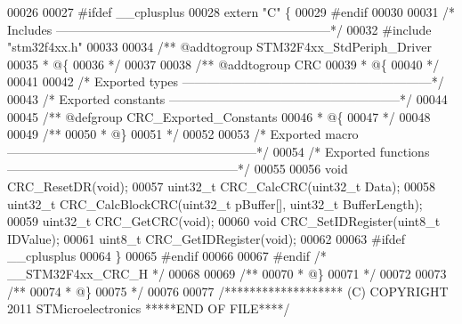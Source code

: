 \begin{DoxyCode}
00026 
00027 \textcolor{preprocessor}{#}\textcolor{preprocessor}{ifdef} \_\_cplusplus
00028  \textcolor{keyword}{extern} \textcolor{stringliteral}{"C"} \{
00029 \textcolor{preprocessor}{#}\textcolor{preprocessor}{endif}
00030 
00031 \textcolor{comment}{/* Includes ------------------------------------------------------------------*/}
00032 \textcolor{preprocessor}{#}\textcolor{preprocessor}{include} "stm32f4xx.h"
00033 
00034 \textcolor{comment}{/** @addtogroup STM32F4xx\_StdPeriph\_Driver}
00035 \textcolor{comment}{  * @\{}
00036 \textcolor{comment}{  */}
00037 
00038 \textcolor{comment}{/** @addtogroup CRC}
00039 \textcolor{comment}{  * @\{}
00040 \textcolor{comment}{  */}
00041 
00042 \textcolor{comment}{/* Exported types ------------------------------------------------------------*/}
00043 \textcolor{comment}{/* Exported constants --------------------------------------------------------*/}
00044 
00045 \textcolor{comment}{/** @defgroup CRC\_Exported\_Constants}
00046 \textcolor{comment}{  * @\{}
00047 \textcolor{comment}{  */}
00048 
00049 \textcolor{comment}{/**}
00050 \textcolor{comment}{  * @\}}
00051 \textcolor{comment}{  */}
00052 
00053 \textcolor{comment}{/* Exported macro ------------------------------------------------------------*/}
00054 \textcolor{comment}{/* Exported functions --------------------------------------------------------*/}
00055 
00056 \textcolor{keywordtype}{void} CRC_ResetDR(\textcolor{keywordtype}{void});
00057 uint32\_t CRC_CalcCRC(uint32\_t Data);
00058 uint32\_t CRC_CalcBlockCRC(uint32\_t pBuffer[], uint32\_t BufferLength);
00059 uint32\_t CRC_GetCRC(\textcolor{keywordtype}{void});
00060 \textcolor{keywordtype}{void} CRC_SetIDRegister(uint8\_t IDValue);
00061 uint8\_t CRC_GetIDRegister(\textcolor{keywordtype}{void});
00062 
00063 \textcolor{preprocessor}{#}\textcolor{preprocessor}{ifdef} \_\_cplusplus
00064 \}
00065 \textcolor{preprocessor}{#}\textcolor{preprocessor}{endif}
00066 
00067 \textcolor{preprocessor}{#}\textcolor{preprocessor}{endif} \textcolor{comment}{/* \_\_STM32F4xx\_CRC\_H */}
00068 
00069 \textcolor{comment}{/**}
00070 \textcolor{comment}{  * @\}}
00071 \textcolor{comment}{  */}
00072 
00073 \textcolor{comment}{/**}
00074 \textcolor{comment}{  * @\}}
00075 \textcolor{comment}{  */}
00076 
00077 \textcolor{comment}{/******************* (C) COPYRIGHT 2011 STMicroelectronics *****END OF FILE****/}
\end{DoxyCode}

